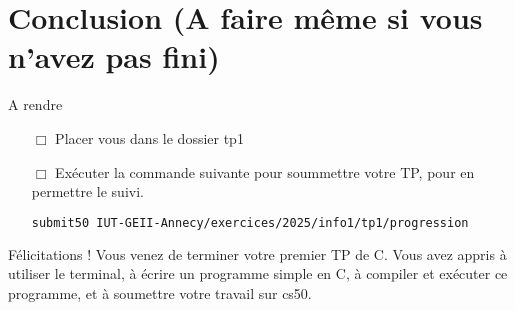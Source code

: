 \section{Conclusion (A faire même si vous n'avez pas fini)}

\begin{UPSTIManipulation}{A rendre}
	\begin{itemize}
		\item[$\Box$] Placer vous dans le dossier tp1
		\item[$\Box$] Exécuter la commande suivante pour soummettre votre TP, pour en permettre le suivi.
		      \begin{lstlisting}[language=bash,style=console]
submit50 IUT-GEII-Annecy/exercices/2025/info1/tp1/progression
\end{lstlisting}
	\end{itemize}
\end{UPSTIManipulation}


\begin{UPSTIinfor}{Félicitations !}
	Vous venez de terminer votre premier TP de C. Vous avez appris à utiliser le terminal, à écrire un programme simple en C, à compiler et exécuter ce programme, et à soumettre votre travail sur cs50.
\end{UPSTIinfor}